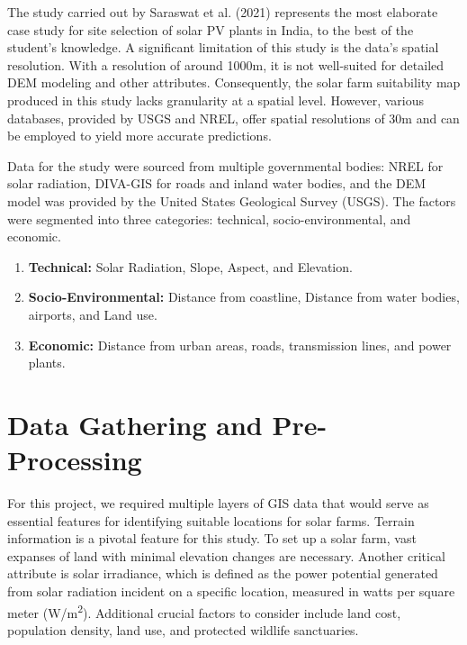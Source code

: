 \documentclass[a4paper,12pt]{Classes/RoboticsLaTeX}
\begin{document}
	The study carried out by Saraswat et al. (2021) represents the most elaborate case study for site selection of solar PV plants in India, 
	to the best of the student's knowledge\cite{saraswat2021}. A significant limitation of this study is the data's spatial resolution. With a resolution of 
	around 1000m, it is not well-suited for detailed DEM modeling and other attributes. Consequently, the solar farm suitability map produced in this study lacks
	 granularity at a spatial level. However, various databases, provided by USGS and NREL, offer spatial resolutions of 30m and can be employed to yield more accurate predictions.

	Data for the study were sourced from multiple governmental bodies: NREL for solar radiation, DIVA-GIS for roads and inland water bodies, and the DEM model was provided by the United States Geological Survey (USGS). The factors were segmented into three categories: technical, socio-environmental, and economic.
	\begin{enumerate}
		\item \textbf{Technical:} Solar Radiation, Slope, Aspect, and Elevation.
		\item \textbf{Socio-Environmental:} Distance from coastline, Distance from water bodies, airports, and Land use.
		\item \textbf{Economic:} Distance from urban areas, roads, transmission lines, and power plants.
	\end{enumerate}

	\section{Data Gathering and Pre-Processing}

	For this project, we required multiple layers of GIS data that would serve as essential features for identifying suitable locations for solar farms. 
	Terrain information is a pivotal feature for this study. To set up a solar farm, vast expanses of land with minimal elevation changes are necessary. 
	Another critical attribute is solar irradiance, which is defined as the power potential generated from solar radiation incident on a specific location, 
	measured in watts per square meter (W/m\textsuperscript{2}). Additional crucial factors to consider include land cost, population density, land use, and 
	protected wildlife sanctuaries.
\end{document}
